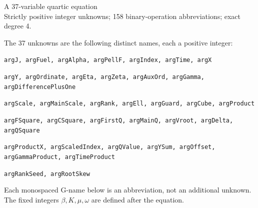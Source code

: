 \documentclass[10pt]{article}
\begin{document}
\begin{center}{\Large A 37-variable quartic equation}\\
Strictly positive integer unknowns; 158 binary-operation abbreviations; exact degree 4.
\end{center}
The 37 unknowns are the following distinct names, each a positive integer:
\par\small
\noindent\texttt{argJ, argFuel, argAlpha, argPellF, argIndex, argTime, argX}\par
\noindent\texttt{argY, argOrdinate, argEta, argZeta, argAuxOrd, argGamma, argDifferencePlusOne}\par
\noindent\texttt{argScale, argMainScale, argRank, argEll, argGuard, argCube, argProduct}\par
\noindent\texttt{argFSquare, argCSquare, argFirstQ, argMainQ, argVroot, argDelta, argQSquare}\par
\noindent\texttt{argProductX, argScaledIndex, argQValue, argYSum, argOffset, argGammaProduct, argTimeProduct}\par
\noindent\texttt{argRankSeed, argRootSkew}\par
\normalsize
Each monospaced G-name below is an abbreviation, not an additional unknown.
The fixed integers $\beta,K,\mu,\omega$ are defined after the equation.
\end{document}
